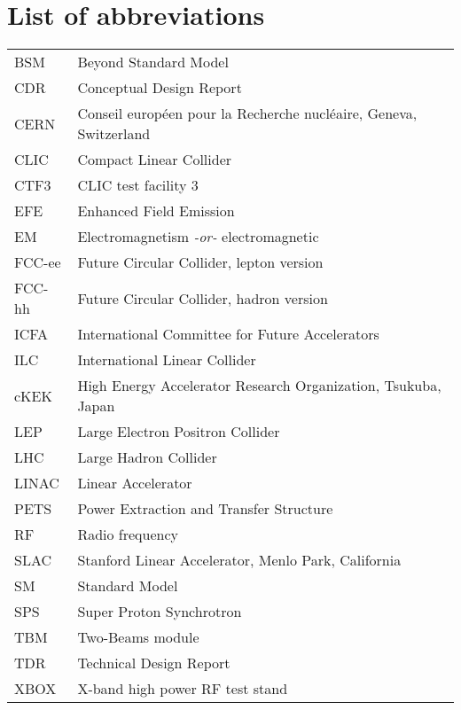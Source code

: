 \chapter*{List of abbreviations}

\begin{tabular}{l l}
BSM		&	Beyond Standard Model\\
CDR		&	Conceptual Design Report\\
CERN	&	Conseil europ\'een pour la Recherche nucl\'eaire, Geneva, Switzerland\\
CLIC		&	Compact Linear Collider\\
CTF3	&	CLIC test facility 3\\
EFE		&	Enhanced Field Emission\\
EM		&	Electromagnetism \textit{-or-} electromagnetic\\
FCC-ee	&	Future Circular Collider, lepton version\\
FCC-hh	&	Future Circular Collider, hadron version\\
ICFA		&	International Committee for Future Accelerators\\
ILC		&	International Linear Collider\\
cKEK		&	High Energy Accelerator Research Organization, Tsukuba, Japan      \\  
LEP		&	Large Electron Positron Collider\\
LHC		&	Large Hadron Collider \\
LINAC	&	Linear Accelerator\\
PETS	&	Power Extraction and Transfer Structure\\
RF		&	Radio frequency\\
SLAC	&	Stanford Linear Accelerator, Menlo Park, California\\
SM		&	Standard Model\\
SPS		&	Super Proton Synchrotron\\
TBM		&	Two-Beams module\\
TDR		&	Technical Design Report\\
XBOX	&	X-band high power RF test stand\\
\end{tabular}